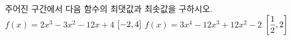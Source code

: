 주어진 구간에서 다음 함수의 최댓값과 최솟값을 구하시오.
 $f(x)=2x^3-3x^2-12x+4$ \quad $[-2{,}\mkern3mu\mathopen{}4]$
 $f(x)=3x^4-12x^3+12x^2-2$ \quad $\left[\dfrac{1}{2}{,}\mkern3mu\mathopen{}2\right]$
